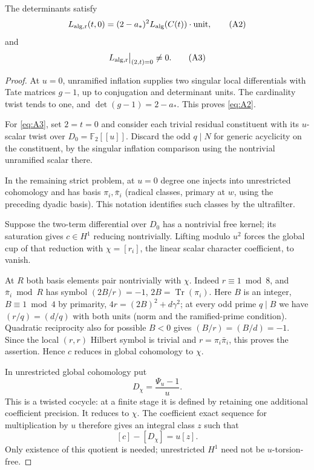 \begin{lemma}
\label{split-measures:transverse}
The determinants satisfy
\[
                   L_{\rm alg,r}(t,0)
                   =(2-a_*)^2 L_{\rm alg}(C(t))\cdot{\rm unit},       \tag{A2}\label{eq:A2}
\]
and
\[
 L_{\rm alg,r}\big|_{(2,t)=0}\ne0.
 \tag{A3}\label{eq:A3}
\]
\end{lemma}
\begin{proof}
At \(u=0\), unramified inflation supplies two singular local differentials
with Tate matrices \(g-1\), up to conjugation and determinant units.  The
cardinality twist tends to one, and \(\det(g-1)=2-a_*\).  This proves
\eqref{eq:A2}.

For \eqref{eq:A3}, set \(2=t=0\) and consider each trivial residual
constituent with its \(u\)-scalar twist over
\(D_0=\mathbb F_2[[u]]\). Discard the odd \(q\mid N\) for generic acyclicity on the constituent, by the singular inflation comparison using the nontrivial unramified scalar there.

In the remaining strict problem, at \(u=0\) degree one injects into unrestricted cohomology and has basis \(\pi_i,\bar\pi_i\) (radical classes, primary at \(w\), using the preceding dyadic basis). This notation identifies such classes by the ultrafilter. 

Suppose the two-term differential over \(D_0\) has a nontrivial free kernel; its saturation gives \(c\in H^1\) reducing nontrivially. Lifting modulo \(u^2\) forces the global cup of that reduction with \(\chi=[r_i]\), the linear scalar character coefficient, to vanish. 

At \(R\) both basis elements pair nontrivially with \(\chi\). Indeed \(r\equiv1\bmod8\), and \(\bar\pi_i\bmod R\) has symbol \((2B/r)=-1\), \(2B=\operatorname{Tr}(\pi_i)\). Here \(B\) is an integer, \(B\equiv1\bmod4\) by primarity, \(4r=(2B)^2+d\gamma^2\); at every odd prime \(q\mid B\) we have \((r/q)=(d/q)\) with both units (norm and the ramified-prime condition). Quadratic reciprocity also for possible \(B<0\) gives \((B/r)=(B/d)=-1\). Since the local \((r,r)\) Hilbert symbol is trivial and \(r=\pi_i\bar\pi_i\), this proves the assertion. Hence \(c\) reduces in global cohomology to \(\chi\).

In unrestricted global cohomology put
\[
 D_\chi=\frac{\Psi_u-1}{u}.
\]
This is a twisted cocycle: at a finite stage it is defined by retaining one
additional coefficient precision.  It reduces to \(\chi\).  The coefficient
exact sequence for multiplication by \(u\) therefore gives an integral
class \(z\) such that
\[
 [c]-[D_\chi]=u[z].
\]
Only existence of this quotient is needed; unrestricted \(H^1\) need not be
\(u\)-torsion-free.


\end{proof}
